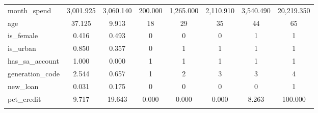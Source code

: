 \begin{table}[!htbp]
\begin{tabular}{@{\extracolsep{5pt}}lccccccc}
month\_spend & 3,001.925 & 3,060.140 & 200.000 & 1,265.000 & 2,110.910 & 3,540.490 & 20,219.350 \\ 
age & 37.125 & 9.913 & 18 & 29 & 35 & 44 & 65 \\ 
is\_female & 0.416 & 0.493 & 0 & 0 & 0 & 1 & 1 \\ 
is\_urban & 0.850 & 0.357 & 0 & 1 & 1 & 1 & 1 \\ 
has\_sa\_account & 1.000 & 0.000 & 1 & 1 & 1 & 1 & 1 \\ 
generation\_code & 2.544 & 0.657 & 1 & 2 & 3 & 3 & 4 \\ 
new\_loan & 0.031 & 0.175 & 0 & 0 & 0 & 0 & 1 \\ 
pct\_credit & 9.717 & 19.643 & 0.000 & 0.000 & 0.000 & 8.263 & 100.000 \\ 
\hline \\[-1.8ex] 
\end{tabular} 
\end{table} 

